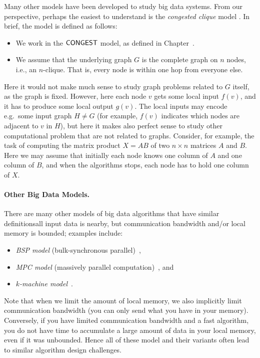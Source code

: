 Many other models have been developed to study big data systems. From our perspective, perhaps the easiest to understand is the \emph{congested clique} model \cite{Lotker2005,Lenzen2013,Dolev2012}. In brief, the model is defined as follows:
\begin{itemize}
  \item We work in the $\textup{\sffamily CONGEST}$ model, as defined in Chapter~.
  \item We assume that the underlying graph $G$ is the complete graph on $n$ nodes, i.e., an $n$-clique. That is, every node is within one hop from everyone else.
\end{itemize}
Here it would not make much sense to study graph problems related to $G$ itself, as the graph is fixed. However, here each node $v$ gets some local input $f(v)$, and it has to produce some local output $g(v)$. The local inputs may encode e.g.\ some input graph $H \ne G$ (for example, $f(v)$ indicates which nodes are adjacent to $v$ in $H$), but here it makes also perfect sense to study other computational problem that are not related to graphs. Consider, for example, the task of computing the matrix product $X = AB$ of two $n \times n$ matrices $A$ and $B$. Here we may assume that initially each node knows one column of $A$ and one column of $B$, and when the algorithms stops, each node has to hold one column of $X$.

\paragraph{Other Big Data Models.}

There are many other models of big data algorithms that have similar definitions\mydash{}all input data is nearby, but communication bandwidth and/or local memory is bounded; examples include:
\begin{itemize}[noitemsep]
  \item \emph{BSP model} (bulk-synchronous parallel)~\cite{Valiant1990},
  \item \emph{MPC model} (massively parallel computation)~\cite{Karloff2010}, and
  \item \emph{$k$-machine model}~\cite{Klauck2015}.
\end{itemize}
Note that when we limit the amount of local memory, we also implicitly limit communication bandwidth (you can only send what you have in your memory). Conversely, if you have limited communication bandwidth and a fast algorithm, you do not have time to accumulate a large amount of data in your local memory, even if it was unbounded. Hence all of these model and their variants often lead to similar algorithm design challenges.


